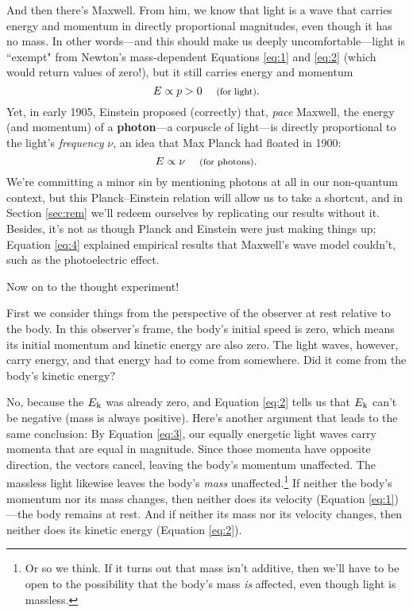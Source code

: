 \documentclass[12pt]{article}
\begin{document}
And then there's Maxwell. From him, we know that light is a wave that carries energy and momentum in directly proportional magnitudes, even though it has no mass. In other words---and this should make us deeply uncomfortable---light is ``exempt" from Newton's mass-dependent Equations \ref{eq:1} and \ref{eq:2} (which would return values of zero!), but it still carries energy and momentum
\begin{equation}\label{eq:3}
E \propto p >0 \quad \text{\footnotesize{ (for light)}} .
\end{equation}
Yet, in early 1905, Einstein proposed (correctly) that, \emph{pace} Maxwell, the energy (and momentum) of a \textbf{photon}---a corpuscle of light---is directly proportional to the light's \emph{frequency} $\nu$, an idea that Max Planck had floated in 1900:
\begin{equation}\label{eq:4}
E \propto \nu \quad \text{\footnotesize{ (for photons)}}.
\end{equation}
We're committing a minor sin by mentioning photons at all in our non-quantum context, but this Planck--Einstein relation will allow us to take a shortcut, and in Section \ref{sec:rem} we'll redeem ourselves by replicating our results without it. Besides, it's not as though Planck and Einstein were just making things up; Equation \ref{eq:4} explained empirical results that Maxwell's wave model couldn't, such as the photoelectric effect.

Now on to the thought experiment!

First we consider things from the perspective of the observer at rest relative to the body. In this observer's frame, the body's initial speed is zero, which means its initial momentum and kinetic energy are also zero. The light waves, however, carry energy, and that energy had to come from somewhere. Did it come from the body's kinetic energy?

No, because the $E_{\mkern.5mu \textrm{k}}$ was already zero, and Equation \ref{eq:2} tells us that $E_{\mkern.5mu \textrm{k}}$ can't be negative (mass is always positive). Here's another argument that leads to the same conclusion: By Equation \ref{eq:3}, our equally energetic light waves carry momenta that are equal in magnitude. Since those momenta have opposite direction, the vectors cancel, leaving the body's momentum unaffected. The massless light likewise leaves the body's \emph{mass} unaffected.\footnote{\label{fn:ma}Or so we think. If it turns out that mass isn't additive, then we'll have to be open to the possibility that the body's mass \emph{is} affected, even though light is massless.} If neither the body's momentum nor its mass changes, then neither does its velocity (Equation \ref{eq:1})---the body remains at rest. And if neither its mass nor its velocity changes, then neither does its kinetic energy (Equation \ref{eq:2}).
\end{document}
